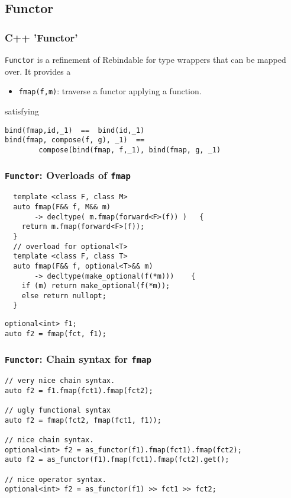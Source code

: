 \documentclass[xcolor=dvipsnames]{beamer}
\newcommand{\cpp}[1]{\lstinline{#1}}
\begin{document}
\subsection{Functor}
\begin{frame}[fragile]
\frametitle{C++ 'Functor'}

\cpp{Functor} is a refinement of Rebindable for type wrappers that can be mapped over.  It provides a

\begin{itemize}
  \item \cpp{fmap(f,m)}: traverse a functor applying a function.
\end{itemize}
        
satisfying

\begin{lstlisting}
bind(fmap,id,_1)  ==  bind(id,_1)
bind(fmap, compose(f, g), _1)  ==  
        compose(bind(fmap, f,_1), bind(fmap, g, _1)
\end{lstlisting}

\end{frame}
\begin{frame}[fragile]
\frametitle{\cpp{Functor}: Overloads of \cpp{fmap}}

\begin{lstlisting}
  template <class F, class M>
  auto fmap(F&& f, M&& m)
       -> decltype( m.fmap(forward<F>(f)) )   {
    return m.fmap(forward<F>(f));
  }
  // overload for optional<T>
  template <class F, class T>
  auto fmap(F&& f, optional<T>&& m) 
       -> decltype(make_optional(f(*m)))    {
    if (m) return make_optional(f(*m));
    else return nullopt;
  }
\end{lstlisting}

\begin{lstlisting}
optional<int> f1;
auto f2 = fmap(fct, f1); 
\end{lstlisting}

\end{frame}
\begin{frame}[fragile]
\frametitle{\cpp{Functor}: Chain syntax for \cpp{fmap}}

\begin{lstlisting}
// very nice chain syntax. 
auto f2 = f1.fmap(fct1).fmap(fct2); 

// ugly functional syntax
auto f2 = fmap(fct2, fmap(fct1, f1));  

// nice chain syntax. 
optional<int> f2 = as_functor(f1).fmap(fct1).fmap(fct2); 
auto f2 = as_functor(f1).fmap(fct1).fmap(fct2).get();

// nice operator syntax.  
optional<int> f2 = as_functor(f1) >> fct1 >> fct2;  
\end{lstlisting}

\end{frame}
\end{document}
